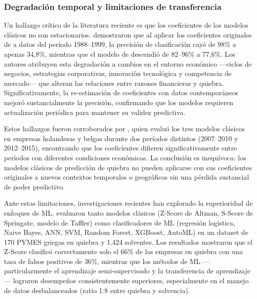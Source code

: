 \documentclass[12pt, letterpaper]{article}
\begin{document}
\subsubsection{Degradaci\'on temporal y limitaciones de transferencia}

Un hallazgo cr\'itico de la literatura reciente es que los coeficientes de los modelos cl\'asicos no son estacionarios. \citet{Grice2003} demostraron que al aplicar los coeficientes originales de \citet{Ohlson1980} a datos del per\'iodo 1988--1999, la precisi\'on de clasificaci\'on cay\'o de 98\% a apenas 34,8\%, mientras que el modelo de \citet{Zmijewski1984} descendi\'o de 82--96\% a 77,6\%. Los autores atribuyen esta degradaci\'on a cambios en el entorno econ\'omico ---ciclos de negocios, estrategias corporativas, innovaci\'on tecnol\'ogica y competencia de mercado--- que alteran las relaciones entre razones financieras y quiebra. Significativamente, la re-estimaci\'on de coeficientes con datos contempor\'aneos mejor\'o sustancialmente la precisi\'on, confirmando que los modelos requieren actualizaci\'on peri\'odica para mantener su validez predictiva.

Estos hallazgos fueron corroborados por \citet{Bouwmeester2020}, quien evalu\'o los tres modelos cl\'asicos en empresas holandesas y belgas durante dos per\'iodos distintos (2007--2010 y 2012--2015), encontrando que los coeficientes difieren significativamente entre per\'iodos con diferentes condiciones econ\'omicas. La conclusi\'on es inequ\'ivoca: los modelos cl\'asicos de predicci\'on de quiebra no pueden aplicarse con sus coeficientes originales a nuevos contextos temporales o geogr\'aficos sin una p\'erdida sustancial de poder predictivo.

Ante estas limitaciones, investigaciones recientes han explorado la superioridad de enfoques de ML. \citet{Papadouli2024} evaluaron tanto modelos cl\'asicos (Z-Score de Altman, S-Score de Springate, modelo de Taffler) como clasificadores de ML (regresi\'on log\'istica, Naive Bayes, ANN, SVM, Random Forest, XGBoost, AutoML) en un dataset de 170 PYMES griegas en quiebra y 1.424 solventes. Los resultados mostraron que el Z-Score clasific\'o correctamente solo el 66\% de las empresas en quiebra con una tasa de falsos positivos de 36\%, mientras que los m\'etodos de ML ---particularmente el aprendizaje semi-supervisado y la transferencia de aprendizaje--- lograron desempe\~nos consistentemente superiores, especialmente en el manejo de datos desbalanceados (ratio 1:8 entre quiebra y solvencia).
\end{document}
